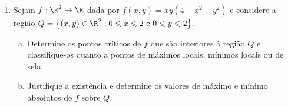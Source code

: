 \documentclass[11pt, oneside, a4paper]{gsm-l}
\begin{document}
\begin{enumerate}
\begin{sol}
\newpage 

\uline{outro modo}: Multiplicador de Lagrange

Minimizar $d^2 \left( {x,y,z} \right) = x^2  + y^2  + z^2$ sujeito a $x^2  - y^2  - z^2  = 1$. Seja $g\left( {x,y,z} \right) = x^2  - y^2  - z^2  - 1$

\[
\begin{gathered}
  \left\{ \begin{gathered}
  \nabla d^2  = \lambda \nabla g \hfill \\
  g\left( {x,y,z} \right) = 0 \hfill \\
\end{gathered}  \right. \hfill \\
  \nabla d^2  = \left( {2x,2y,2z} \right) \hfill \\
  \nabla g = \left( {2x, - 2y, - 2z} \right) \hfill \\
  \left\{ \begin{gathered}
  2x = \lambda 2x \hfill \\
  2y =  - \lambda 2y \hfill \\
  2z =  - \lambda 2z \hfill \\
  x^2  - y^2  - z^2  = 1 \hfill \\
\end{gathered}  \right. \hfill \\
   \Rightarrow y = 0 = z \hfill \\
   \Rightarrow x =  \pm 1 \hfill \\
\end{gathered}
\]

\end{sol}

  \item Sejam $f:\R^2 \to \R$ dada por $f\left( {x,y} \right) = xy\left( {4 - x^2  - y^2 } \right)$ e considere a região $Q = \left\{ {\left( {x,y} \right) \in \R^2 :0 \leqslant x \leqslant 2{\text{ e }}0 \leqslant y \leqslant 2} \right\}$.

  \begin{enumerate}[(a)]
    \item Determine os pontos críticos de $f$ que são interiores \`a região $Q$ e classifique-os quanto a pontos de máximos locais, mínimos locais ou de sela;
    \item Justifique a exist\^encia e determine os valores de máximo e mínimo absolutos de $f$ sobre $Q$.
  \end{enumerate}

\newpage 


\end{enumerate}
\end{document}

